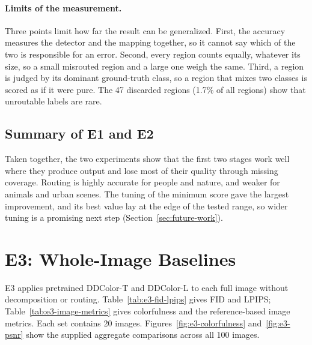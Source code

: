 \documentclass{FastFyp}
\begin{document}
\paragraph{Limits of the measurement.} Three points limit how far the result can be generalized. First, the accuracy measures the detector and the mapping together, so it cannot say which of the two is responsible for an error. Second, every region counts equally, whatever its size, so a small misrouted region and a large one weigh the same. Third, a region is judged by its dominant ground-truth class, so a region that mixes two classes is scored as if it were pure. The 47 discarded regions (1.7\% of all regions) show that unroutable labels are rare.
 
\subsection{Summary of E1 and E2}
Taken together, the two experiments show that the first two stages work well where they produce output and lose most of their quality through missing coverage. Routing is highly accurate for people and nature, and weaker for animals and urban scenes. The tuning of the minimum score gave the largest improvement, and its best value lay at the edge of the tested range, so wider tuning is a promising next step (Section~\ref{sec:future-work}).


\section{E3: Whole-Image Baselines}
\label{sec:e3-baselines}

E3 applies pretrained DDColor-T and DDColor-L to each full image without
decomposition or routing. Table~\ref{tab:e3-fid-lpips} gives FID and LPIPS;
Table~\ref{tab:e3-image-metrics} gives colorfulness and the reference-based
image metrics. Each set contains 20 images. Figures~\ref{fig:e3-colorfulness}
and~\ref{fig:e3-psnr} show the supplied aggregate comparisons across all 100
images.
\end{document}
